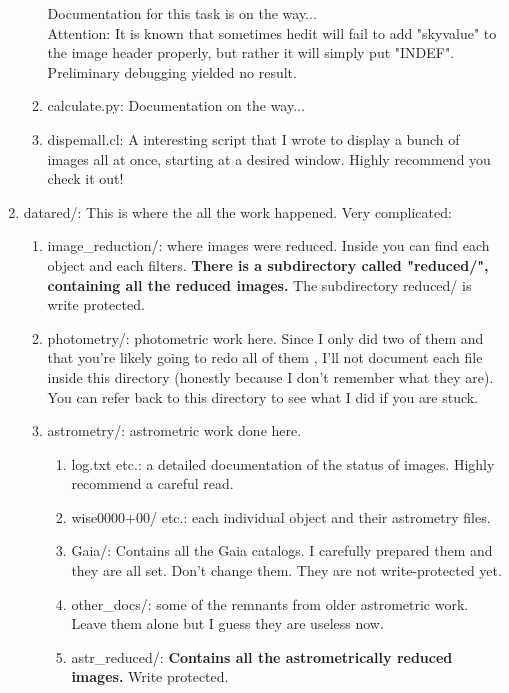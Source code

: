 \documentclass{article}
\begin{document}
\begin{enumerate}
\begin{enumerate}
Documentation for this task is on the way...\\

Attention: It is known that sometimes hedit will fail to add "skyvalue" to the image header properly, but rather it will simply put "INDEF". Preliminary debugging yielded no result.
\item calculate.py: Documentation on the way...\\
\item dispemall.cl: A interesting script that I wrote to display a bunch of images all at once, starting at a desired window. Highly recommend you check it out!
\end{enumerate}
\item datared/: This is where the all the work happened. Very complicated:
\begin{enumerate}
\item image\_reduction/: where images were reduced. Inside you can find each object and each filters. \textbf{There is a subdirectory called "reduced/", containing all the reduced images.} The subdirectory reduced/ is write protected.\\
\item photometry/: photometric work here. Since I only did two of them and that you're likely going to redo all of them , I'll not document each file inside this directory (honestly because I don't remember what they are). You can refer back to this directory to see what I did if you are stuck.\\
\item astrometry/: astrometric work done here.
\begin{enumerate}
\item log.txt etc.: a detailed documentation of the status of images. Highly recommend a careful read.\\
\item wise0000+00/ etc.: each individual object and their astrometry files.\\
\item Gaia/: Contains all the Gaia catalogs. I carefully prepared them and they are all set. Don't change them. They are not write-protected yet.\\
\item other\_docs/: some of the remnants from older astrometric work. Leave them alone but I guess they are useless now.\\
\item astr\_reduced/: \textbf{Contains all the astrometrically reduced images. }Write protected.
\end{enumerate}
\end{enumerate}


\end{enumerate}
\end{document}
